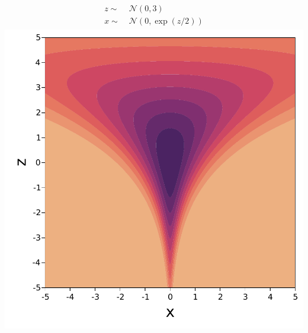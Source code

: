 \begin{minipage}{0.5\textwidth}
    \centering
    \begin{align}
        \begin{aligned}
            z \sim&\; \mathcal{N}(0, 3)\\
            x \sim&\; \mathcal{N}(0, \exp(z/2))
        \end{aligned}
    \end{align}
    \includegraphics[width=\textwidth]{./chapters/1_introduction/figures/neals_funnel_centered.pdf}
    \label{fig:neals_centered}
\end{minipage}
